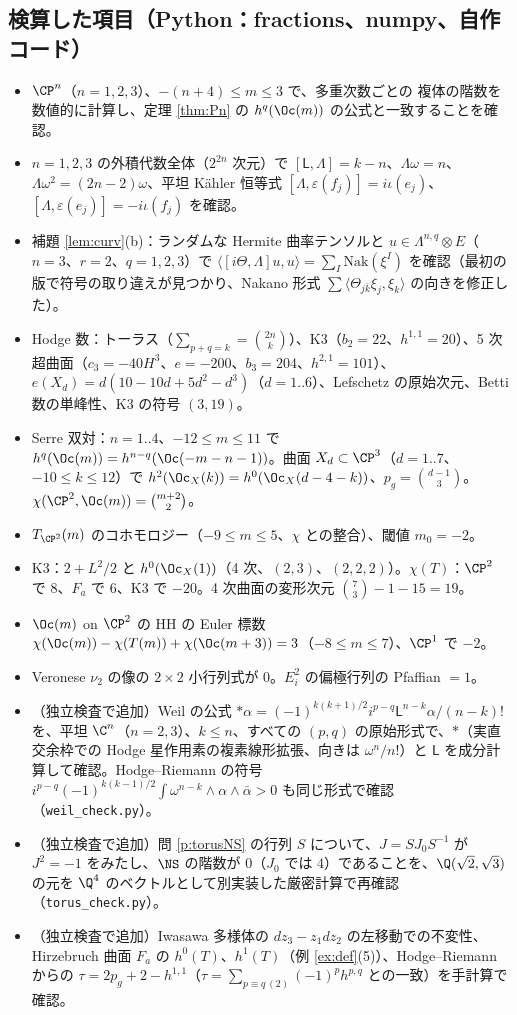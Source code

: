 \subsection*{検算した項目（Python：fractions、numpy、自作コード）}
\begin{itemize}
\item $\CP^n$（$n=1,2,3$）、$-(n+4)\le m\le3$ で、多重次数ごとの \Cech{} 複体の階数を数値的に計算し、定理 \ref{thm:Pn} の $h^q(\Oc(m))$ の公式と一致することを確認。
\item $n=1,2,3$ の外積代数全体（$2^{2n}$ 次元）で $[\mathsf L,\Lambda]=k-n$、$\Lambda\omega=n$、$\Lambda\omega^2=(2n-2)\omega$、平坦 Kähler 恒等式 $[\Lambda,\varepsilon(f_j)]=i\iota(e_j)$、$[\Lambda,\varepsilon(e_j)]=-i\iota(f_j)$ を確認。
\item 補題 \ref{lem:curv}(b)：ランダムな Hermite 曲率テンソルと $u\in\Lambda^{n,q}\otimes E$（$n=3$、$r=2$、$q=1,2,3$）で $\langle[i\Theta,\Lambda]u,u\rangle=\sum_I\mathrm{Nak}(\xi^I)$ を確認（最初の版で符号の取り違えが見つかり、Nakano 形式 $\sum\langle\Theta_{j\bar k}\xi_j,\xi_k\rangle$ の向きを修正した）。
\item Hodge 数：トーラス（$\sum_{p+q=k}=\binom{2n}k$）、K3（$b_2=22$、$h^{1,1}=20$）、5 次超曲面（$c_3=-40H^3$、$e=-200$、$b_3=204$、$h^{2,1}=101$）、$e(X_d)=d(10-10d+5d^2-d^3)$（$d=1..6$）、Lefschetz の原始次元、Betti 数の単峰性、K3 の符号 $(3,19)$。
\item Serre 双対：$n=1..4$、$-12\le m\le11$ で $h^q(\Oc(m))=h^{n-q}(\Oc(-m-n-1))$。曲面 $X_d\subset\CP^3$（$d=1..7$、$-10\le k\le12$）で $h^2(\Oc_X(k))=h^0(\Oc_X(d-4-k))$、$p_g=\binom{d-1}3$。$\chi(\CP^2,\Oc(m))=\binom{m+2}2$。
\item $T_{\CP^2}(m)$ のコホモロジー（$-9\le m\le5$、$\chi$ との整合）、閾値 $m_0=-2$。
\item K3：$2+L^2/2$ と $h^0(\Oc_X(1))$（4 次、$(2,3)$、$(2,2,2)$）。$\chi(T)$：$\CP^2$ で $8$、$F_a$ で $6$、K3 で $-20$。4 次曲面の変形次元 $\binom73-1-15=19$。
\item $\Oc(m)$ on $\CP^2$ の HH の Euler 標数 $\chi(\Oc(m))-\chi(T(m))+\chi(\Oc(m+3))=3$（$-8\le m\le7$）、$\CP^1$ で $-2$。
\item Veronese $\nu_2$ の像の $2\times2$ 小行列式が $0$。$E_i^2$ の偏極行列の Pfaffian $=1$。
\item （独立検査で追加）Weil の公式 $\ast\alpha=(-1)^{k(k+1)/2}i^{p-q}\mathsf L^{n-k}\alpha/(n-k)!$ を、平坦 $\C^n$（$n=2,3$）、$k\le n$、すべての $(p,q)$ の原始形式で、$\ast$（実直交余枠での Hodge 星作用素の複素線形拡張、向きは $\omega^n/n!$）と $\mathsf L$ を成分計算して確認。Hodge--Riemann の符号 $i^{p-q}(-1)^{k(k-1)/2}\int\omega^{n-k}\wedge\alpha\wedge\bar\alpha>0$ も同じ形式で確認（\texttt{weil\_check.py}）。\item （独立検査で追加）問 \ref{p:torusNS} の行列 $S$ について、$J=SJ_0S^{-1}$ が $J^2=-1$ をみたし、$\NS$ の階数が $0$（$J_0$ では $4$）であることを、$\Q(\sqrt2,\sqrt3)$ の元を $\Q^4$ のベクトルとして別実装した厳密計算で再確認（\texttt{torus\_check.py}）。\item （独立検査で追加）Iwasawa 多様体の $dz_3-z_1dz_2$ の左移動での不変性、Hirzebruch 曲面 $F_a$ の $h^0(T)$、$h^1(T)$（例 \ref{ex:def}(5)）、Hodge--Riemann からの $\tau=2p_g+2-h^{1,1}$（$\tau=\sum_{p\equiv q\,(2)}(-1)^ph^{p,q}$ との一致）を手計算で確認。

\end{itemize}
